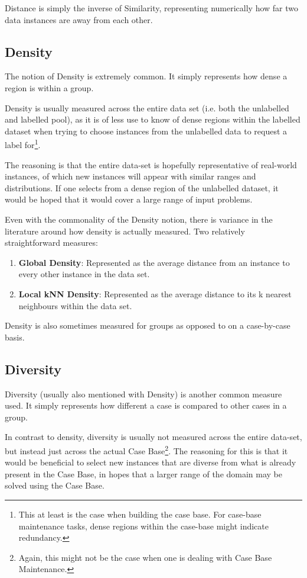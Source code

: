 \documentclass[a4paper,11pt]{report}
\begin{document}
Distance is simply the inverse of Similarity, representing numerically how far two data instances are away from each other.

\subsection{Density}
The notion of Density is extremely common. It simply represents how dense a region is within a group.

Density is usually measured across the entire data set (i.e. both the unlabelled and labelled pool), as it is of less use to know of dense regions within the labelled dataset when trying to choose instances from the unlabelled data to request a label for\footnote{This at least is the case when building the case base. For case-base maintenance tasks, dense regions within the case-base might indicate redundancy.}. 

The reasoning is that the entire data-set is hopefully representative of real-world instances, of which new instances will appear with similar ranges and distributions. If one selects from a dense region of the unlabelled dataset, it would be hoped that it would cover a large range of input problems.

Even with the commonality of the Density notion, there is variance in the literature around how density is actually measured. Two relatively straightforward measures:
\begin{enumerate}
	\item \textbf{Global Density}: Represented as the average distance from an instance to every other instance in the data set.
	\item \textbf{Local kNN Density}: Represented as the average distance to its k nearest neighbours within the data set.
\end{enumerate}

Density is also sometimes measured for groups as opposed to on a case-by-case basis\cite{Smyth1998}.

\subsection{Diversity}

Diversity (usually also mentioned with Density) is another common measure used. It simply represents how different a case is compared to other cases in a group.

In contrast to density, diversity is usually not measured across the entire data-set, but instead just across the actual Case Base\footnote{Again, this might not be the case when one is dealing with Case Base Maintenance.}. The reasoning for this is that it would be beneficial to select new instances that are diverse from what is already present in the Case Base, in hopes that a larger range of the domain may be solved using the Case Base. 
\end{document}
